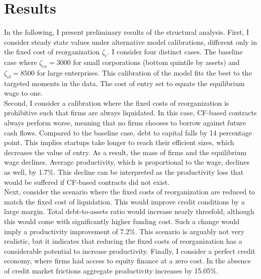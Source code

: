 \documentclass[12pt]{article}
\begin{document}
\newpage

\section{Results}
 
In the following, I present preliminary results of the structural analysis. First, I consider steady state values under alternative model calibrations, different only in the fixed cost of reorganization $\zeta_c$. I consider four distinct cases. The baseline case where $\zeta_{cs} = 3000$ for small corporations (bottom quintile by assets) and $\zeta_{cl} = 8500$ for large enterprises. This calibration of the model fits the best to the targeted moments in the data. The cost of entry set to equate the equilibrium wage to one. \vspace{3mm} \\
Second, I consider a calibration where the fixed costs of reorganization is prohibitive such that firms are always liquidated. In this case, CF-based contracts always perform worse, meaning that no firms chooses to borrow against future cash flows. Compared to the baseline case, debt to capital falls by 14 percentage point. This implies startups take longer to reach their efficient sizes, which decreases the value of entry. As a result, the mass of firms and the equilibrium wage declines. Average productivity, which is proportional to the wage, declines as well, by 1.7\%. This decline can be interpreted as the productivity loss that would be suffered if CF-based contracts did not exist. \vspace{3mm} \\
Next, consider the scenario where the fixed costs of reorganization are reduced to match the fixed cost of liquidation. This would improve credit conditions by a large margin. Total debt-to-assets ratio would increase nearly threefold, although this would come with significantly higher funding cost. Such a change would imply a productivity improvement of 7.2\%. This scenario is arguably not very realistic, but it indicates that reducing the fixed costs of reorganization has a considerable potential to increase productivity. Finally, I consider a perfect credit economy, where firms had access to equity finance at a zero cost. In the absence of credit market frictions aggregate productivity increases by 15.05\%.

\newpage
\end{document}
